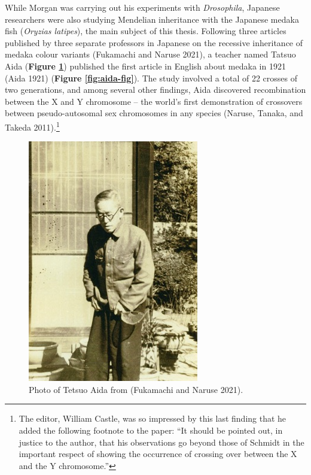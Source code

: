 \documentclass[
]{book}
\begin{document}
While Morgan was carrying out his experiments with \emph{Drosophila}, Japanese researchers were also studying Mendelian inheritance with the Japanese medaka fish (\emph{Oryzias latipes}), the main subject of this thesis. Following three articles published by three separate professors in Japanese on the recessive inheritance of medaka colour variants (Fukamachi and Naruse 2021), a teacher named Tatsuo Aida (\textbf{Figure \ref{fig:aida}}) published the first article in English about medaka in 1921 (Aida 1921) (\textbf{Figure \ref{fig:aida-fig}}). The study involved a total of 22 crosses of two generations, and among several other findings, Aida discovered recombination between the X and Y chromosome -- the world's first demonstration of crossovers between pseudo-autosomal sex chromosomes in any species (Naruse, Tanaka, and Takeda 2011).\footnote{The editor, William Castle, was so impressed by this last finding that he added the following footnote to the paper: ``It should be pointed out, in justice to the author, that his observations go beyond those of Schmidt in the important respect of showing the occurrence of crossing over between the X and the Y chromosome.''}



\begin{figure}

{\centering \includegraphics[width=0.9\linewidth]{figs/introduction/Aida} 

}

\caption{Photo of Tetsuo Aida from (Fukamachi and Naruse 2021).}\label{fig:aida}
\end{figure}
\end{document}
